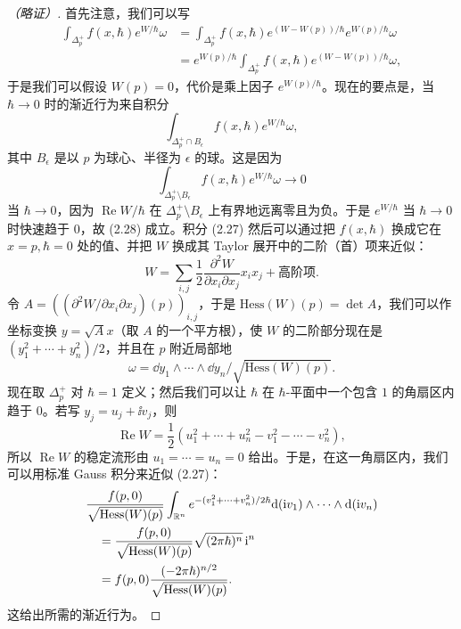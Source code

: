 \begin{proof}[（略证）]
首先注意，我们可以写
\begin{align*}
\int_{\Delta_p^+}f(x,\hbar)e^{W/\hbar}\omega&=\int_{\Delta_p^+}f(x,\hbar)e^{(W-W(p))/\hbar}e^{W(p)/\hbar}\omega\\
&=e^{W(p)/\hbar}\int_{\Delta_p^+}f(x,\hbar)e^{(W-W(p))/\hbar}\omega,
\end{align*}
于是我们可以假设 $W(p)=0$，代价是乘上因子 $e^{W(p)/\hbar}$。现在的要点是，当 $\hbar\to0$ 时的渐近行为来自积分
\begin{equation}
\int_{\Delta_p^+\cap B_\epsilon}f(x,\hbar)e^{W/\hbar}\omega, \tag{2.27}
\end{equation}
其中 $B_\epsilon$ 是以 $p$ 为球心、半径为 $\epsilon$ 的球。这是因为
\begin{equation}
\int_{\Delta_p^+\setminus B_\epsilon}f(x,\hbar)e^{W/\hbar}\omega\to0 \tag{2.28}
\end{equation}
当 $\hbar\to0$，因为 $\operatorname{Re}W/\hbar$ 在 $\Delta_p^+\setminus B_\epsilon$ 上有界地远离零且为负。于是 $e^{W/\hbar}$ 当 $\hbar\to0$ 时快速趋于 $0$，故 (2.28) 成立。积分 (2.27) 然后可以通过把 $f(x,\hbar)$ 换成它在 $x=p,\hbar=0$ 处的值、并把 $W$ 换成其 Taylor 展开中的二阶（首）项来近似：
\[
W=\sum_{i,j}\frac12\frac{\partial^2W}{\partial x_i\partial x_j}x_ix_j+\text{高阶项}.
\]
令 $A=((\partial^2W/\partial x_i\partial x_j)(p))_{i,j}$，于是 $\mathrm{Hess}(W)(p)=\det A$，我们可以作坐标变换 $y=\sqrt{A}x$（取 $A$ 的一个平方根），使 $W$ 的二阶部分现在是 $(y_1^2+\cdots+y_n^2)/2$，并且在 $p$ 附近局部地
\[
\omega=\dd y_1\wedge\cdots\wedge\dd y_n/\sqrt{\mathrm{Hess}(W)(p)}.
\]
现在取 $\Delta_p^+$ 对 $\hbar=1$ 定义；然后我们可以让 $\hbar$ 在 $\hbar$-平面中一个包含 $1$ 的角扇区内趋于 $0$。若写 $y_j=u_j+\ii v_j$，则
\[
\operatorname{Re}W=\frac12(u_1^2+\cdots+u_n^2-v_1^2-\cdots-v_n^2),
\]
所以 $\operatorname{Re}W$ 的稳定流形由 $u_1=\cdots=u_n=0$ 给出。于是，在这一角扇区内，我们可以用标准 Gauss 积分来近似 (2.27)：
\begin{align*}
&\frac{f(p,0)}{\sqrt{\mathrm{Hess}(W)(p)}}\int_{\mathbb{R}^n}e^{-(v_1^2+\cdots+v_n^2)/2\hbar}\mathrm{d}(\mathrm{i} v_1)\wedge\cdots\wedge\mathrm{d}(\mathrm{i} v_n)\\
&\quad=\frac{f(p,0)}{\sqrt{\mathrm{Hess}(W)(p)}}\sqrt{(2\pi\hbar)^n}\,\mathrm{i}^n\\
&\quad=f(p,0)\frac{(-2\pi\hbar)^{n/2}}{\sqrt{\mathrm{Hess}(W)(p)}}.
\end{align*}
这给出所需的渐近行为。
\end{proof}

